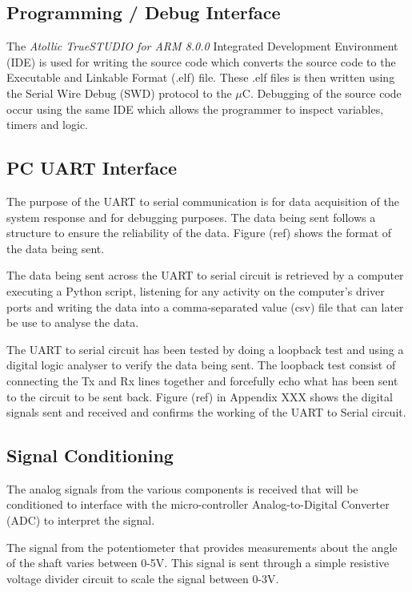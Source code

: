 \documentclass[a4paper,12pt]{article}
\begin{document}
	\subsection{Programming / Debug Interface}
	
	The \textit{Atollic TrueSTUDIO for ARM 8.0.0} Integrated Development Environment (IDE) is used for writing the source code which converts the source code to the Executable and Linkable Format (.elf) file. These .elf files is then written using the Serial Wire Debug (SWD) protocol to the $\mu$C. Debugging of the source code occur using the same IDE which allows the programmer to inspect variables, timers and logic.
	
	\subsection{PC UART Interface }
	
	The purpose of the UART to serial communication is for data acquisition of the system response and for debugging purposes. The data being sent follows a structure to ensure the reliability of the data. Figure (ref) shows the format of the data being sent.
	
	The data being sent across the UART to serial circuit is retrieved by a computer executing a Python script, listening for any activity on the computer's driver ports and writing the data into a comma-separated value (csv) file that can later be use to analyse the data.
	
	
	The UART to serial circuit has been tested by doing a loopback test and using a digital logic analyser to verify the data being sent. The loopback test consist of connecting the Tx and Rx lines together and forcefully echo what has been sent to the circuit to be sent back. Figure (ref) in Appendix XXX shows the digital signals sent and received and confirms the working of the UART to Serial circuit.
	
	\subsection{Signal Conditioning}
	
	The analog signals from the various components is received that will be conditioned to interface with the micro-controller Analog-to-Digital Converter (ADC) to interpret the signal.
	
	The signal from the potentiometer that provides measurements about the angle of the shaft varies between 0-5V. This signal is sent through a simple resistive voltage divider circuit to scale the signal between 0-3V. 
	
\end{document}
